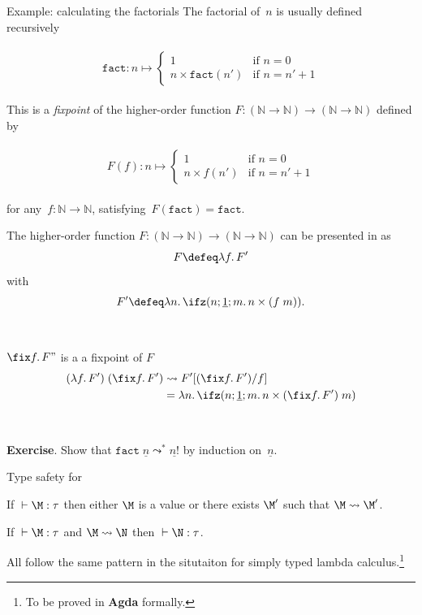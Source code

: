 \begin{frame}{Example: calculating the factorials}
  The factorial of~$n$ is usually defined recursively\\~\\
  \[
    \mathtt{fact}\colon n \mapsto
    \begin{cases}
      1 & \text{if } n = 0 \\
      n \times \mathtt{fact}(n') & \text{if } n = n' + 1
    \end{cases}
  \]
  ~\\
  This is a \emph{fixpoint} of the higher-order function
  $F\colon {(\mathbb{N}\to\mathbb{N})} \to {(\mathbb{N}\to\mathbb{N})}$ defined
  by \\~\\
  \[
    \label{eq:factorial_informal}
    F(f)\colon n \mapsto
    \begin{cases}
      1 & \text{if } n = 0 \\
      n \times f(n') & \text{if } n = n' + 1
    \end{cases}
  \]
  ~\\
  for any~$f\colon\mathbb{N}\to\mathbb{N}$, satisfying~$F(\mathtt{fact})
  =\mathtt{fact}$.
\end{frame}

\begin{frame}
  The higher-order function ${F\colon (\mathbb{N}\to\mathbb{N})
  \to(\mathbb{N}\to\mathbb{N})}$ can be presented in \PCF{} as  
  \[
    F \defeq \lambda f.\, F'
  \]
  with
  \[
    F' \defeq \lambda n.\, \ifz(n; \underline{1}; m.\, n\times (f\;m)).
  \]
  \\~\\
  $\fix f.\,F"$ is a a fixpoint of $F$
  \begin{align*}
    (\lambda f.\,F')\;(\fix f.\,F') & \leadsto F' [(\fix f.\,F')/f] \\
    & = \lambda n.\,\ifz(n; \underline{1}; m.\, n\times (\fix f.\, F')\; m)
  \end{align*}
  \\~\\
  \textbf{Exercise}. Show that $\mathtt{fact}\;\underline{n}
  \leadsto^*\underline{n!}$ by induction on~$\underline{n}$. 
\end{frame}

\begin{frame}{Type safety for \PCF}
  \begin{theorem}
    If ${} \vdash \M : \tau$ then either $\M$ is a value or
    there exists $\M'$ such that $\M \leadsto \M'$. 
  \end{theorem}
  \begin{theorem}
    If ${}\vdash \M : \tau$ and $\M \leadsto \N$ then ${}\vdash \N : \tau$. 
  \end{theorem}
  All follow the same pattern in the situtaiton for simply typed lambda
  calculus.\footnote{
    To be proved in \textbf{Agda} formally.
  }
\end{frame}


